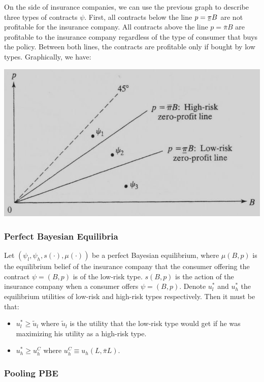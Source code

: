 \documentclass[12pt]{report}
\newcommand{\ubar}[1]{\underaccent{\bar}{#1}}
\begin{document}
On the side of insurance companies, we can use the previous graph to describe three types of contracts $\psi$. First, all contracts below the line $p = \ubar\pi B$ are not profitable for the insurance company. All contracts above the line $p = \bar\pi B$ are profitable to the insurance company regardless of the type of consumer that buys the policy. Between both lines, the contracts are profitable only if bought by low types. Graphically, we have:\begin{center}
\includegraphics[scale=0.5]{images/advselecprofit}
\end{center}

\subsubsection{Perfect Bayesian Equilibria}

Let $(\psi_l, \psi_h, s(\cdot), \mu(\cdot))$ be a perfect Bayesian equilibrium, where $\mu(B,p)$ is the equilibrium belief of the insurance company that the consumer offering the contract $\psi = (B,p)$ is of the low-risk type. $s(B,p)$ is the action of the insurance company when a consumer offers $\psi = (B,p)$. Denote $u_l^*$ and $u_h^*$ the equilibrium utilities of low-risk and high-risk types respectively. Then it must be that:\begin{itemize}
\item $u_l^* \geq \tilde u_l$ where $\tilde u_l$ is the utility that the low-risk type would get if he was maximizing his utility as a high-risk type.
\item $u_h^* \geq u_h^C$ where $u_h^C \equiv u_h(L, \bar\pi L)$. 
\end{itemize}

\subsubsection{Pooling PBE}
\end{document}
